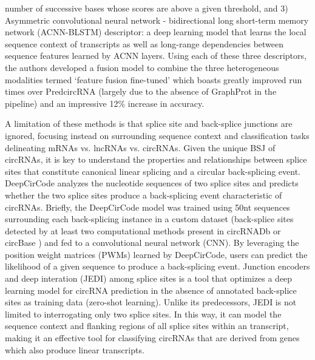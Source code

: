\documentclass[pdflatex,sn-mathphys-num]{sn-jnl}
\begin{document}
number of successive bases whose scores are above a given threshold, and 3) Asymmetric convolutional neural network - bidirectional long short-term memory network (ACNN-BLSTM) descriptor: a deep learning model that learns the local sequence context of transcripts as well as long-range dependencies between sequence features learned by ACNN layers. Using each of these three descriptors, the authors developed a fusion model to combine the three heterogeneous modalities termed `feature fusion fine-tuned' which boasts greatly improved run times over PredcircRNA (largely due to the absence of GraphProt in the pipeline) and an impressive 12\% increase in accuracy. \par
A limitation of these methods is that splice site and back-splice junctions are ignored, focusing instead on surrounding sequence context and classification tasks delineating mRNAs vs. lncRNAs vs. circRNAs. Given the unique BSJ of circRNAs, it is key to understand the properties and relationships between splice sites that constitute canonical linear splicing and a circular back-splicing event. DeepCirCode \cite{DeepCirCode} analyzes the nucleotide sequences of two splice sites and predicts whether the two splice sites produce a back-splicing event characteristic of circRNAs. Briefly, the DeepCirCode model was trained using 50nt sequences surrounding each back-splicing instance in a custom dataset (back-splice sites detected by at least two computational methods present in circRNADb \cite{circrnadb} or circBase \cite{circbase}) and fed to a convolutional neural network (CNN). By leveraging the position weight matrices (PWMs) learned by DeepCirCode, users can predict the likelihood of a given sequence to produce a back-splicing event. Junction encoders and deep interation (JEDI) among splice sites \cite{JEDI} is a tool that optimizes a deep learning model for circRNA prediction in the absence of annotated back-splice sites as training data (zero-shot learning). Unlike its predecessors, JEDI is not limited to interrogating only two splice sites. In this way, it can model the sequence context and flanking regions of all splice sites within an transcript, making it an effective tool for classifying circRNAs that are derived from genes which also produce linear transcripts.\par
\end{document}
